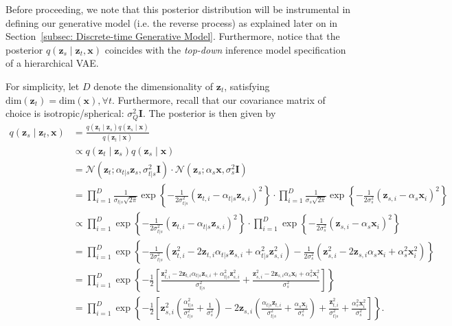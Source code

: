 Before proceeding, we note that this posterior distribution will be instrumental in defining our generative model (i.e. the reverse process) as explained later on in Section~\ref{subsec: Discrete-time Generative Model}. Furthermore, notice that the posterior $q(\mathbf{z}_s \mid \mathbf{z}_t, \mathbf{x})$ coincides with the \textit{top-down} inference model specification of a hierarchical VAE. 

For simplicity, let $D$ denote the dimensionality of $\mathbf{z}_t$, satisfying $\mathrm{dim}(\mathbf{z}_t) = \mathrm{dim}(\mathbf{x}), \forall t$. Furthermore, recall that our covariance matrix of choice is isotropic/spherical: $\sigma^2_Q \mathbf{I}$. The posterior is then given by
%
\begin{align}
    q(\mathbf{z}_s \mid \mathbf{z}_t, \mathbf{x}) &
    = \frac{q(\mathbf{z}_t \mid \mathbf{z}_s)q(\mathbf{z}_s \mid \mathbf{x})}{q(\mathbf{z}_t \mid \mathbf{x})} 
    \\ & \propto q(\mathbf{z}_t \mid \mathbf{z}_s)q(\mathbf{z}_s \mid \mathbf{x})
    \\[5pt] & 
    = \mathcal{N}\left(\mathbf{z}_t; \alpha_{t|s} \mathbf{z}_s, \sigma^2_{t|s}\mathbf{I}\right)\cdot \mathcal{N}\left(\mathbf{z}_s;\alpha_s\mathbf{x}, \sigma^2_s\mathbf{I} \right)
    \\[5pt] & = \prod_{i=1}^D \frac{1}{\sigma_{t|s}\sqrt{2\pi}}\exp\left\{-\frac{1}{2\sigma_{t|s}^2}\left(\mathbf{z}_{t,i} - \alpha_{t|s}\mathbf{z}_{s,i}\right)^2 \right\} \cdot \prod_{i=1}^D \frac{1}{\sigma_{s}\sqrt{2\pi}}\exp\left\{-\frac{1}{2\sigma^2_{s}}\left(\mathbf{z}_{s,i} - \alpha_{s}\mathbf{x}_i\right)^2 \right\} 
    \\[5pt] & \propto \prod_{i=1}^D \exp\left\{-\frac{1}{2\sigma_{t|s}^2}\left(\mathbf{z}_{t,i} - \alpha_{t|s}\mathbf{z}_{s,i}\right)^2 \right\} \cdot \prod_{i=1}^D \exp\left\{-\frac{1}{2\sigma^2_{s}}\left(\mathbf{z}_{s,i} - \alpha_{s}\mathbf{x}_i\right)^2 \right\}
    \\[5pt] & = \prod_{i=1}^D \exp\left\{-\frac{1}{2\sigma^2_{t|s}}\left(\mathbf{z}_{t,i}^2 - 2\mathbf{z}_{t,i}\alpha_{t|s}\mathbf{z}_{s,i} + \alpha_{t|s}^2\mathbf{z}_{s,i}^2\right) -\frac{1}{2\sigma^2_{s}}\left(\mathbf{z}_{s,i}^2 - 2\mathbf{z}_{s,i}\alpha_{s}\mathbf{x}_i + \alpha_{s}^2\mathbf{x}_i^2\right) \right\}
    \\[5pt] & = \prod_{i=1}^D \exp\left\{-\frac{1}{2}\left[\frac{\mathbf{z}_{t,i}^2 - 2\mathbf{z}_{t,i}\alpha_{t|s}\mathbf{z}_{s,i} + \alpha_{t|s}^2\mathbf{z}_{s,i}^2}{\sigma^2_{t|s}} + \frac{\mathbf{z}_{s,i}^2  -2\mathbf{z}_{s,i}\alpha_{s}\mathbf{x}_i + \alpha_{s}^2\mathbf{x}_i^2}{\sigma^2_{s}} \right]\right\}
    \\[5pt] & = \prod_{i=1}^D \exp\left\{-\frac{1}{2}\left[
    \mathbf{z}_{s,i}^2\left(\frac{\alpha_{t|s}^2}{\sigma_{t|s}^2} + \frac{1}{\sigma_s^2}\right) -2\mathbf{z}_{s,i}\left( \frac{\alpha_{t|s}\mathbf{z}_{t,i}}{\sigma_{t|s}^2}+\frac{\alpha_s\mathbf{x}_i}{\sigma_s^2}\right)
    +\frac{\mathbf{z}_{t,i}^2}{\sigma_{t|s}^2} + \frac{\alpha_s^2\mathbf{x}_i^2}{\sigma_{s}^2}
    \right]\right\}. 
    \label{eq:mm}
\end{align}
%

